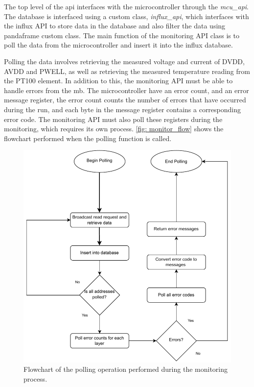 \documentclass[main.tex]{subfiles}
\begin{document}
The top level of the \gls{api} interfaces with the microcontroller through the \textit{mcu\_api}. The database is interfaced using a custom class, \textit{influx\_api}, which interfaces with the influx API to store data in the database and also filter the data using pandaframe custom class. The main function of the monitoring API class is to poll the data from the microcontroller and insert it into the influx database. 

Polling the data involves retrieving the measured voltage and current of DVDD, AVDD and PWELL, as well as retrieving the measured temperature reading from the PT100 element. In addition to this, the monitoring API must be able to handle errors from the \gls{mb}. The microcontroller have an error count, and an error message register, the error count counts the number of errors that have occurred during the run, and each byte in the message register contains a corresponding error code. The monitoring API must also poll these registers during the monitoring, which requires its own process. \autoref{fig: monitor_flow} shows the flowchart performed when the polling function is called.

\begin{figure}[!ht]
    \centering
    \includegraphics[scale=0.9]{images/Monitoring Flowchart.pdf}
    \caption{Flowchart of the polling operation performed during the monitoring process.}
    \label{fig: monitor_flow}
\end{figure}
\FloatBarrier
\end{document}
